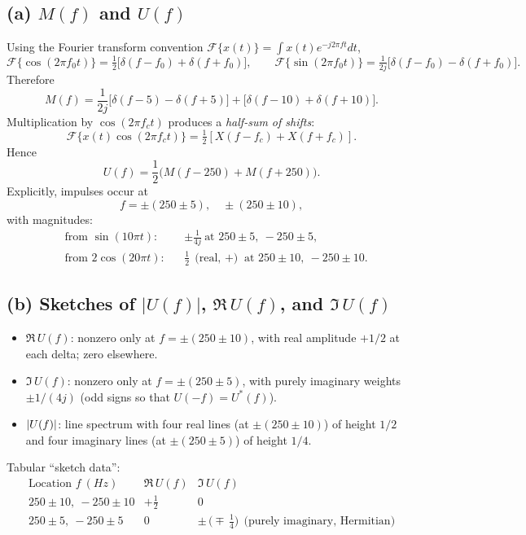 \documentclass[11pt]{article}
\begin{document}
\subsection*{(a) $M(f)$ and $U(f)$}
Using the Fourier transform convention $\mathcal{F}\{x(t)\}=\int x(t)e^{-j2\pi f t}dt$,
\[
\mathcal{F}\{\cos(2\pi f_0 t)\}=\tfrac{1}{2}\big[\delta(f-f_0)+\delta(f+f_0)\big],\qquad
\mathcal{F}\{\sin(2\pi f_0 t)\}=\tfrac{1}{2j}\big[\delta(f-f_0)-\delta(f+f_0)\big].
\]
Therefore
\[
\boxed{~~M(f)=\frac{1}{2j}\big[\delta(f-5)-\delta(f+5)\big]
+\big[\delta(f-10)+\delta(f+10)\big].~~}
\]
Multiplication by $\cos(2\pi f_c t)$ produces a \emph{half-sum of shifts}:
\[
\mathcal{F}\{x(t)\cos(2\pi f_c t)\}=\tfrac{1}{2}\!\left[X(f-f_c)+X(f+f_c)\right].
\]
Hence
\[
\boxed{~~U(f)=\frac{1}{2}\Big(M(f-250)+M(f+250)\Big).~~}
\]
Explicitly, impulses occur at
\[
f= \pm(250\pm 5),\quad \pm(250\pm 10),
\]
with magnitudes:
\[
\begin{aligned}
&\text{from } \sin(10\pi t): && \pm \frac{1}{4j}\ \text{at } 250\pm 5,\ -250\pm 5,\\
&\text{from } 2\cos(20\pi t): && \frac{1}{2}\ \text{(real, $+$)} \text{ at } 250\pm 10,\ -250\pm 10.
\end{aligned}
\]

\subsection*{(b) Sketches of $|U(f)|$, $\Re\,U(f)$, and $\Im\,U(f)$}
\begin{itemize}[leftmargin=1.2em]
\item $\Re\,U(f)$: nonzero only at $f=\pm(250\pm 10)$, with real amplitude $+1/2$ at each delta; zero elsewhere.
\item $\Im\,U(f)$: nonzero only at $f=\pm(250\pm 5)$, with purely imaginary weights $\pm 1/(4j)$ (odd signs so that $U(-f)=U^*(f)$).
\item $\abs{U(f)}$: line spectrum with four real lines (at $\pm(250\pm 10)$) of height $1/2$ and four imaginary lines (at $\pm(250\pm 5)$) of height $1/4$.
\end{itemize}
Tabular ``sketch data'':
\[
\begin{array}{c|c|c}
\text{Location } f~(\si{Hz}) & \Re\,U(f) & \Im\,U(f)\\\hline
250\pm 10,\ -250\pm 10 & +\tfrac{1}{2} & 0\\
250\pm 5,\ -250\pm 5 & 0 & \pm\,\Big(\mp\,\tfrac{1}{4}\Big)~~\text{(purely imaginary, Hermitian)}
\end{array}
\]
\end{document}
